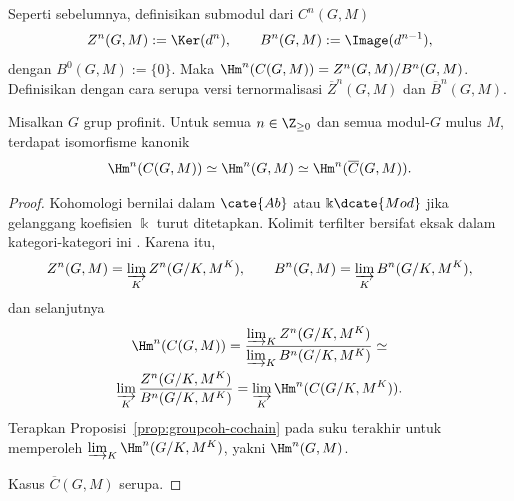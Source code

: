 Seperti sebelumnya, definisikan submodul dari $C^n(G,M)$
\[ Z^n(G,M):=\Ker(d^n),\qquad B^n(G,M):=\Image(d^{n-1}), \]
dengan $B^0(G,M):=\{0\}$. Maka
$\Hm^n(C(G,M))=Z^n(G,M)/B^n(G,M)$. Definisikan dengan cara serupa versi
ternormalisasi $\overline{Z}^n(G,M)$ dan $\overline{B}^n(G,M)$.

\begin{theorem}\label{prop:profinite-group-standard}
	Misalkan $G$ grup profinit. Untuk semua $n\in\Z_{\geq0}$ dan semua modul-$G$
	mulus $M$, terdapat isomorfisme kanonik
	\[ \Hm^n(C(G,M))\simeq\Hm^n(G,M)
	\simeq\Hm^n(\overline{C}(G,M)). \]
\end{theorem}
\begin{proof}
	Kohomologi bernilai dalam $\cate{Ab}$ atau $\Bbbk\dcate{Mod}$ jika
	gelanggang koefisien $\Bbbk$ turut ditetapkan. Kolimit terfilter bersifat
	eksak dalam kategori-kategori ini \cite[Teorema 6.2.2]{Li1}. Karena itu,
	\[ Z^n(G,M)=\varinjlim_KZ^n(G/K,M^K),\qquad
	B^n(G,M)=\varinjlim_KB^n(G/K,M^K), \]
	dan selanjutnya
	\begin{multline*}
		\Hm^n(C(G,M))
		=\dfrac{\varinjlim_KZ^n(G/K,M^K)}
		{\varinjlim_KB^n(G/K,M^K)}\simeq\\
		\varinjlim_K\frac{Z^n(G/K,M^K)}{B^n(G/K,M^K)}
		=\varinjlim_K\Hm^n(C(G/K,M^K)).
	\end{multline*}
	Terapkan Proposisi~\ref{prop:groupcoh-cochain} pada suku terakhir untuk
	memperoleh $\varinjlim_K\Hm^n(G/K,M^K)$, yakni $\Hm^n(G,M)$.

	Kasus $\overline{C}(G,M)$ serupa.
\end{proof}
